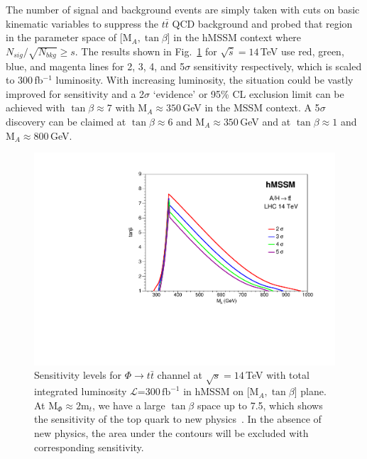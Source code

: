The number of signal and background events are simply taken with cuts on basic kinematic variables to suppress the $t\bar t$ QCD background and probed that region in the parameter space of [M$_{A}, \tan\beta$] in the hMSSM context where $N_{sig}/\sqrt{N_{bkg}}\geq s$. The results shown in Fig.~\ref{fig:Htt_sensitivity} for $\sqrt{\hat{s}} = 14$\,TeV use red, green, blue, and magenta lines for 2, 3, 4, and 5$\sigma$ sensitivity respectively, which is scaled to 300\,fb$^{-1}$ luminosity. With increasing luminosity, the situation could be vastly improved for sensitivity and a 2$\sigma$ `evidence' or 95\% CL exclusion limit can be achieved with $\tan\beta\approx 7$ with M$_{A}\approx 350$\,GeV in the MSSM context. A 5$\sigma$ discovery can be claimed at $\tan\beta \approx 6$ and M$_{A}\approx 350$\,GeV and at $\tan\beta \approx 1$ and M$_{A}\approx 800$\,GeV. 
\begin{figure}[htbp]
\centering
\includegraphics[trim={0cm 0.0cm 0 0.8cm},clip, scale=0.6]{fig/sm_beyond/plots_constraints_LHC14_300_AH_tt.pdf}
\caption{Sensitivity levels for $\Phi\rightarrow t\bar{t}$ channel at $\sqrt{s}=14$\,TeV with total integrated luminosity $\mathcal{L}$=300\,$\text{f}\text{b}^{-1}$ in hMSSM on [$\text{M}_{A}, \tan\beta$] plane. At M$_{\Phi} \approx 2\text{m}_{t}$, we have a large $\tan\beta$ space up to 7.5, which shows the sensitivity of the top quark to new physics~\cite{Djouadi:2015jea}. In the absence of new physics, the area under the contours will be excluded with corresponding sensitivity.}\label{fig:Htt_sensitivity}
\end{figure}

